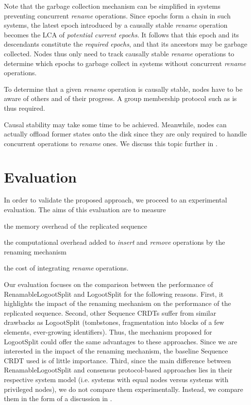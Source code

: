 \documentclass[10pt,journal,compsoc]{IEEEtran}
\newcommand{\ie}{i.e. }
\begin{document}
Note that the garbage collection mechanism can be simplified in systems preventing concurrent \emph{rename} operations.
Since epochs form a chain in such systems, the latest epoch introduced by a causally stable \emph{rename} operation becomes the \ac{LCA} of \emph{potential current epochs}.
It follows that this epoch and its descendants constitute the \emph{required epochs}, and that its ancestors may be garbage collected.
Nodes thus only need to track causally stable \emph{rename} operations to determine which epochs to garbage collect in systems without concurrent \emph{rename} operations.

To determine that a given \emph{rename} operation is causally stable, nodes have to be aware of others and of their progress.
A group membership protocol such as \cite{swim2002,lifeguard2018} is thus required.

Causal stability may take some time to be achieved.
Meanwhile, nodes can actually offload former states onto the disk since they are only required to handle concurrent operations to \emph{rename} ones.
We discuss this topic further in .

\section{Evaluation}

\label{sec:evaluation}

In order to validate the proposed approach, we proceed to an experimental evaluation.
The aims of this evaluation are to measure
\begin{enumerate*}[label=(\roman*)]
    \item the memory overhead of the replicated sequence
    \item the computational overhead added to \emph{insert} and \emph{remove} operations by the renaming mechanism
    \item the cost of integrating \emph{rename} operations.
\end{enumerate*}

Our evaluation focuses on the comparison between the performance of RenamableLogootSplit and LogootSplit for the following reasons.
First, it highlights the impact of the renaming mechanism on the performance of the replicated sequence.
Second, other Sequence \acp{CRDT} \cite{ROH2011354,briot:hal-01343941,lseq2017} suffer from similar drawbacks as LogootSplit (tombstones, fragmentation into blocks of a few elements, ever-growing identifiers).
Thus, the mechanism proposed for LogootSplit could offer the same advantages to these approaches.
Since we are interested in the impact of the renaming mechanism, the baseline Sequence \ac{CRDT} used is of little importance.
Third, since the main difference between RenamableLogootSplit and consensus protocol-based approaches lies in their respective system model (\ie systems with equal nodes versus systems with privileged nodes), we do not compare them experimentally.
Instead, we compare them in the form of a discussion in .
\end{document}
